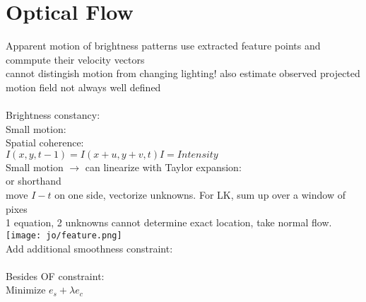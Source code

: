 \section{Optical Flow}
Apparent motion of brightness patterns use extracted feature points and commpute their velocity vectors \\
 cannot distingish motion from changing lighting! also estimate observed projected motion field  not always well defined \\
 \\
Brightness constancy: \\
Small motion: \\
Spatial coherence: \\
 $I(x, y, t - 1) = I(x + u, y + v, t) I = Intensity$\\
Small motion $\rightarrow$ can linearize with Taylor expansion:\\
 or shorthand \\
move $I-t$ on one side, vectorize unknowns. For LK, sum up over a window of pixes\\
 1 equation, 2 unknowns cannot determine exact location, take normal flow. \texttt{[image: jo/feature.png]}\\
Add additional smoothness constraint: \\
\\
Besides OF constraint: \\
 Minimize $e_s + \lambda e_c$
